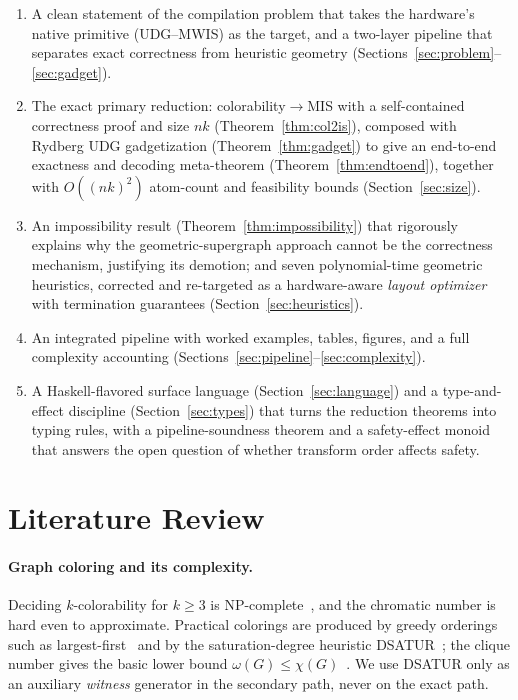 \documentclass[11pt]{article}
\theoremstyle{definition}
\theoremstyle{remark}
\begin{document}
\begin{enumerate}[label=(\arabic*),leftmargin=2.2em]
  \item A clean statement of the compilation problem that takes the hardware's native
        primitive (UDG--MWIS) as the target, and a two-layer pipeline that separates
        exact correctness from heuristic geometry
        (Sections~\ref{sec:problem}--\ref{sec:gadget}).
  \item The exact primary reduction: colorability$\to$MIS with a self-contained
        correctness proof and size $nk$ (Theorem~\ref{thm:col2is}), composed with
        Rydberg UDG gadgetization (Theorem~\ref{thm:gadget}) to give an end-to-end
        exactness and decoding meta-theorem (Theorem~\ref{thm:endtoend}), together
        with $O((nk)^2)$ atom-count and feasibility bounds (Section~\ref{sec:size}).
  \item An impossibility result (Theorem~\ref{thm:impossibility}) that rigorously
        explains why the geometric-supergraph approach cannot be the correctness
        mechanism, justifying its demotion; and seven polynomial-time geometric
        heuristics, corrected and re-targeted as a hardware-aware \emph{layout
        optimizer} with termination guarantees (Section~\ref{sec:heuristics}).
  \item An integrated pipeline with worked examples, tables, figures, and a full
        complexity accounting (Sections~\ref{sec:pipeline}--\ref{sec:complexity}).
  \item A Haskell-flavored surface language (Section~\ref{sec:language}) and a
        type-and-effect discipline (Section~\ref{sec:types}) that turns the reduction
        theorems into typing rules, with a pipeline-soundness theorem and a
        safety-effect monoid that answers the open question of whether transform order
        affects safety.
\end{enumerate}

\section{Literature Review}
\label{sec:related}

\paragraph{Graph coloring and its complexity.} Deciding $k$-colorability for
$k\ge 3$ is NP-complete~\cite{Karp1972,GareyJohnson1979}, and the chromatic number is
hard even to approximate. Practical colorings are produced by greedy orderings such as
largest-first~\cite{Welsh1967} and by the saturation-degree heuristic
DSATUR~\cite{Brelaz1979}; the clique number gives the basic lower bound
$\omega(G)\le\chi(G)$~\cite{West2001}. We use DSATUR only as an auxiliary
\emph{witness} generator in the secondary path, never on the exact path.
\end{document}
